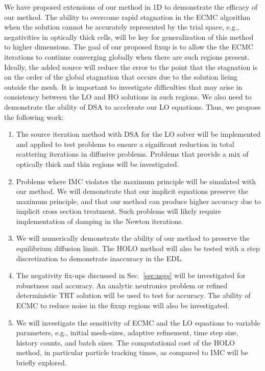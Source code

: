 \documentclass[11pt]{article}
\begin{document}
We have proposed extensions of our method in 1D to demonstrate the efficacy of our method.  
The ability to overcome rapid stagnation in the ECMC algorithm when the solution cannot
be accurately represented by the trial space, e.g., negativities in optically thick
cells,  will be key for generalization of this
method to higher dimensions.  The goal of our proposed fixup is to allow the
the ECMC iterations to continue converging globally when there are such regions
present.  Ideally, the added source will reduce the error to the point that the
stagnation is on the order of the global stagnation that occurs due to the solution
lieing outside the mesh.  It is important to investigate difficulties that may arise
in consistency between the LO and HO solutions in such regions.  We also need to demonstrate the
ability of DSA to accelerate our LO equations.  Thus, we propose the following work:
\begin{enumerate}
    \item The source iteration method with DSA for the LO solver will be implemented
        and applied to test problems to ensure a significant reduction in total scattering
        iterations in diffusive problems.  Problems that provide a mix of optically
        thick and thin regions will be investigated.
    \item Problems where IMC violates the maximum principle will be simulated with our
        method.  We will demonstrate that our implicit equations preserve the maximum
        principle, and that our method can produce higher accuracy due to implicit cross section
        treatment. Such problems will likely require implementation of damping in the
        Newton iterations.
    \item We will numerically demonstrate the ability of our method to preserve
        the equilibrium diffusion limit.  The HOLO method will also be tested with a step
        discretization to demonstrate inaccuracy in the EDL.
    \item The negativity fix-ups discussed in Sec.~\ref{sec:negs} will be investigated for robustness and
        accuracy.  An analytic neutronics problem or refined deterministic TRT solution
        will be used to test for accuracy.  The ability of ECMC to reduce noise in
        the fixup regions will also be investigated.
    \item We will investigate the sensitivity of ECMC and the LO equations to
        variable parameters, e.g., initial mesh-sizes, adaptive refinement, time step size, history
        counts, and batch sizes.  The computational cost of the HOLO method, in particular
        particle tracking times, as compared to IMC will be briefly explored.
\end{enumerate}

\pagebreak


\begin{spacing}{1}
  
  
\end{spacing}
\end{document}
